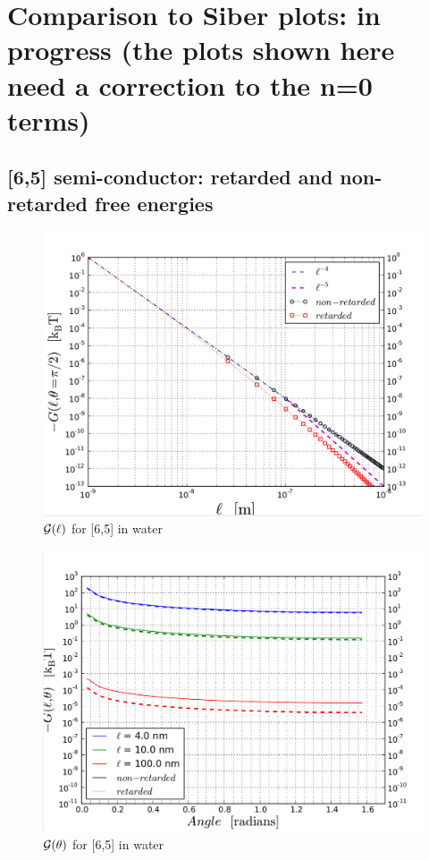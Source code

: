 \documentclass[a4paper]{article}
\begin{document}
\section{Comparison to Siber plots: in progress (the plots shown here need a
correction to the n=0 terms)}
\subsection{[6,5] semi-conductor: retarded and non-retarded free energies}
\begin{center}
\begin{figure}[t!]
\begin{center}
\includegraphics[width=1.5\textwidth]{plots/siber_comp_G_vs_l_sw_r_nr_65.png}
\hskip 43pt
\caption{$\cal{G}(\ell)$ for [6,5] in water}
\label{eiz65}
\end{center}
\end{figure} 

\begin{figure}[t!]
\begin{center}
\includegraphics[width=1.5\textwidth]{plots/siber_comp_G_vs_theta_65.png}
\hskip 43pt
\caption{$\cal{G}(\theta)$ for [6,5] in water}
\label{eiz65}
\end{center}
\end{figure} 


\end{center}
\end{document}
